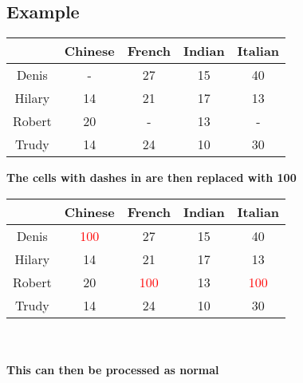 \documentclass{article}[18pt]
\begin{document}
\subsection{Example}
\begin{tabular}{|c|c|c|c|c|}
\hline
&Chinese&French&Indian&Italian\\
\hline
Denis&-&27&15&40\\
\hline
Hilary&14&21&17&13\\
\hline
Robert&20&-&13&-\\
\hline
Trudy&14&24&10&30\\
\hline
\end{tabular}
\newpage
\textbf{The cells with dashes in are then replaced with 100}\\
\begin{tabular}{|c|c|c|c|c|}
\hline
&Chinese&French&Indian&Italian\\
\hline
Denis&\textcolor{red}{100}&27&15&40\\
\hline
Hilary&14&21&17&13\\
\hline
Robert&20&\textcolor{red}{100}&13&\textcolor{red}{100}\\
\hline
Trudy&14&24&10&30\\
\hline
\end{tabular}\\
\\
\textbf{This can then be processed as normal}
\end{document}
